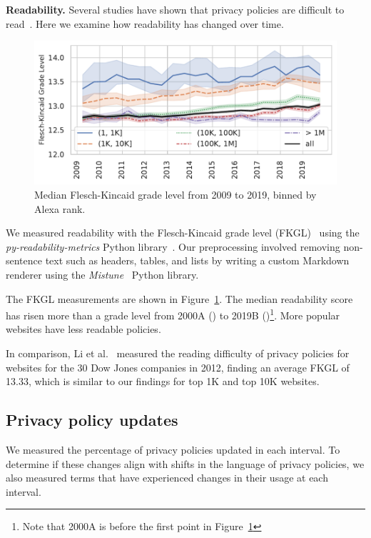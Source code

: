 {\bf Readability.}
\label{sec:ppot:readability}
Several studies have shown that privacy policies are difficult to read~\cite{mcdonald2008cost,fabian2017large,milne2006longitudinal,li2012online}. 
Here we examine how readability has changed over time.
\begin{figure}
\centering
\includegraphics[width=1\columnwidth]{chapters/privacypolicies/figures/flesch_kincaid_dist.pdf}
\caption[Median Flesch-Kincaid grade level]{Median Flesch-Kincaid grade level from 2009 to 2019, binned by Alexa rank. 
}
\label{fig:readability}
\end{figure}
We measured readability with the Flesch-Kincaid grade level (FKGL)~\cite{kincaid1975derivation}
using the \textit{py-readability-metrics} Python library~\cite{pyreadabilitymetrics}.
Our preprocessing involved removing non-sentence text such as headers, tables, and lists by writing a custom Markdown renderer using the \emph{Mistune}~\cite{mistune} Python library.

The FKGL measurements are shown in Figure~\ref{fig:readability}. The median readability score has risen more than a grade level from 2000A (\medianFKStart) to 2019B (\medianFKEnd)\footnote{Note that 2000A is before the first point in  Figure~\ref{fig:readability}}. More popular websites have less readable policies.

In comparison, Li et al.~\cite{li2012online} measured the reading difficulty of privacy policies for websites for the 30 Dow Jones companies in 2012, finding an average FKGL of 13.33, which is similar to our findings for top 1K and top 10K websites.





\subsection{Privacy policy updates}
We measured the percentage of privacy policies updated in each interval.
To determine if these changes align with shifts in the language of privacy policies, we also measured terms that have experienced changes in their usage at each interval.

